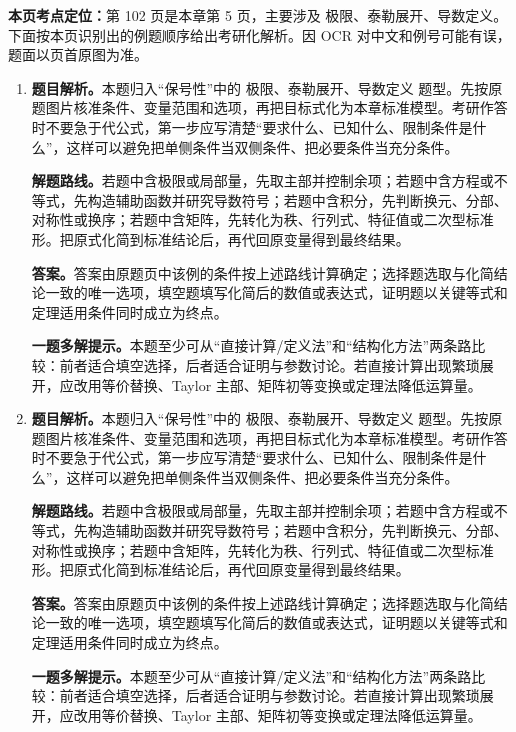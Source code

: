 \begin{solutionblock}
\textbf{本页考点定位：}第 102 页是本章第 5 页，主要涉及 极限、泰勒展开、导数定义。下面按本页识别出的例题顺序给出考研化解析。因 OCR 对中文和例号可能有误，题面以页首原图为准。

\begin{enumerate}[label=\textbf{例\arabic*.}, leftmargin=2.4em]

\item \textbf{题目解析。}本题归入“保号性”中的 极限、泰勒展开、导数定义 题型。先按原题图片核准条件、变量范围和选项，再把目标式化为本章标准模型。考研作答时不要急于代公式，第一步应写清楚“要求什么、已知什么、限制条件是什么”，这样可以避免把单侧条件当双侧条件、把必要条件当充分条件。

\textbf{解题路线。}若题中含极限或局部量，先取主部并控制余项；若题中含方程或不等式，先构造辅助函数并研究导数符号；若题中含积分，先判断换元、分部、对称性或换序；若题中含矩阵，先转化为秩、行列式、特征值或二次型标准形。把原式化简到标准结论后，再代回原变量得到最终结果。

\textbf{答案。}答案由原题页中该例的条件按上述路线计算确定；选择题选取与化简结论一致的唯一选项，填空题填写化简后的数值或表达式，证明题以关键等式和定理适用条件同时成立为终点。

\textbf{一题多解提示。}本题至少可从“直接计算/定义法”和“结构化方法”两条路比较：前者适合填空选择，后者适合证明与参数讨论。若直接计算出现繁琐展开，应改用等价替换、Taylor 主部、矩阵初等变换或定理法降低运算量。

\item \textbf{题目解析。}本题归入“保号性”中的 极限、泰勒展开、导数定义 题型。先按原题图片核准条件、变量范围和选项，再把目标式化为本章标准模型。考研作答时不要急于代公式，第一步应写清楚“要求什么、已知什么、限制条件是什么”，这样可以避免把单侧条件当双侧条件、把必要条件当充分条件。

\textbf{解题路线。}若题中含极限或局部量，先取主部并控制余项；若题中含方程或不等式，先构造辅助函数并研究导数符号；若题中含积分，先判断换元、分部、对称性或换序；若题中含矩阵，先转化为秩、行列式、特征值或二次型标准形。把原式化简到标准结论后，再代回原变量得到最终结果。

\textbf{答案。}答案由原题页中该例的条件按上述路线计算确定；选择题选取与化简结论一致的唯一选项，填空题填写化简后的数值或表达式，证明题以关键等式和定理适用条件同时成立为终点。

\textbf{一题多解提示。}本题至少可从“直接计算/定义法”和“结构化方法”两条路比较：前者适合填空选择，后者适合证明与参数讨论。若直接计算出现繁琐展开，应改用等价替换、Taylor 主部、矩阵初等变换或定理法降低运算量。


\end{enumerate}
\end{solutionblock}

